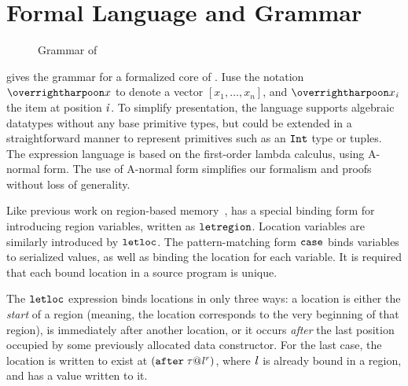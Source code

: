 \section{Formal Language and Grammar}
\label{subsec:grammar}

\begin{figure}
  
  \caption{Grammar of \ourcalc{}}
  \label{fig:grammar}
\end{figure}

 gives the grammar for a formalized core of \ourcalc{}.
%
Iuse the notation $\overharpoon{x}$ to denote a vector $[
x_1, \ldots, x_n]$, and $\overharpoon{x_{\ind}}$ the item at position
$\mathit{i}$.
%
To simplify presentation, the language supports
algebraic datatypes without any base primitive types, but could be extended in a straightforward
manner to represent primitives such as an $\texttt{Int}$ type or tuples.
%
The expression language is based on the first-order lambda calculus,
using A-normal form.
%
The use of A-normal form simplifies our formalism and proofs
without loss of generality.

Like previous work on region-based memory~\cite{regioncalcs},
\ourcalc{} has a special binding
form for introducing region variables, written as
$\texttt{letregion}$.
%
Location variables are similarly introduced by $\texttt{letloc}$.
%
The pattern-matching form $\texttt{case}$ binds variables to
serialized values, as well as binding the location for each variable.
%
It is required that each bound location in
a source program is unique.
%

The $\texttt{letloc}$ expression binds locations in only three ways:
a location is either the \emph{start} of a region (meaning, the
location corresponds to the very beginning of that region), is
immediately after another location, or it occurs \emph{after} the last
position occupied by some previously allocated data constructor.
%
For the last case, the location is written to exist at
$(\texttt{after}\; \mathit{\tau} @ {\mathit{l}}^{\mathit{r}})$, where $\mathit{l}$ is already
bound in a region, and has a value written to it.


